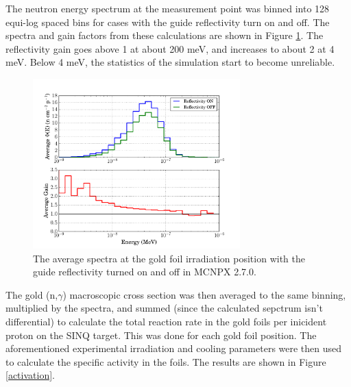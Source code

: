 \documentclass[a4paper,
              ]{jacow}
\begin{document}
The neutron energy spectrum at the measurement point was binned into 128 equi-log spaced bins for cases with the guide reflectivity turn on and off.  The spectra and gain factors from these calculations are shown in Figure \ref{gain}.  The reflectivity gain goes above 1 at about 200 meV, and increases to about 2 at 4 meV.  Below 4 meV, the statistics of the simulation start to become unreliable.

\begin{figure}[!htb]
   \centering
   \includegraphics*[trim = 10mm 0mm 15mm 0mm, width=80mm]{graphics/gain.pdf}
   \caption{The average spectra at the gold foil irradiation position with the guide reflectivity turned on and off in MCNPX 2.7.0.}
   \label{gain}
\end{figure}

The gold (n,$\gamma$) macroscopic cross section was then averaged to the same binning, multiplied by the spectra, and summed (since the calculated sepctrum isn't differential) to calculate the total reaction rate in the gold foils per inicident proton on the SINQ target.  This was done for each gold foil position.  The aforementioned experimental irradiation and cooling parameters were then used to calculate the specific activity in the foils.  The results are shown in Figure \ref{activation}.
\end{document}
